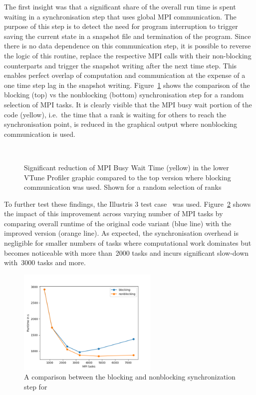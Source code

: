 \documentclass[../main]{subfiles}
\begin{document}
The first insight was that a significant share of the overall run time is spent waiting in a synchronisation step that uses global MPI communication.
The purpose of this step is to detect the need for program interruption to trigger saving the current state in a snapshot file and termination of the program.
Since there is no data dependence on this communication step, it is possible to reverse the logic of this routine, replace the respective MPI calls with their non-blocking counterparts and trigger the snapshot writing after the next time step.
This enables perfect overlap of computation and communication at the expense of a one time step lag in the snapshot writing.
Figure~\ref{fig:arepo_mpicom} shows the comparison of the blocking (top) vs the nonblocking (bottom) synchronisation step for a random selection of MPI tasks.
It is clearly visible that the MPI busy wait portion of the code (yellow), i.e.\ the time that a rank is waiting for others to reach the synchronisation point, is reduced in the graphical output where nonblocking communication is used.

\begin{figure}[htp]
	\centering
	\\
	\caption{Significant reduction of MPI Busy Wait Time (yellow) in the lower VTune Profiler graphic compared to the top version where blocking communication was used. Shown for a random selection of ranks}
	\label{fig:arepo_mpicom} %
\end{figure}
To further test these findings, the Illustris 3 test case~\cite{Nelson_2015} was used.
Figure~\ref{fig:arepo_blockvsnonblock} shows the impact of this improvement across varying number of MPI tasks by comparing overall runtime of the original code variant (blue line) with the improved version (orange line).
As expected, the synchronisation overhead is negligible for smaller numbers of tasks where computational work dominates but becomes noticeable with more than~2000 tasks and incurs significant slow-down with~3000 tasks and more.
\begin{figure}[htp]
	\centering
	\includegraphics[clip,width=0.6\textwidth]{images/Arepo_blockingvsNonblocking.png}
	\caption{A comparison between the blocking and nonblocking synchronization step for }
	\label{fig:arepo_blockvsnonblock} %
\end{figure}
\end{document}
